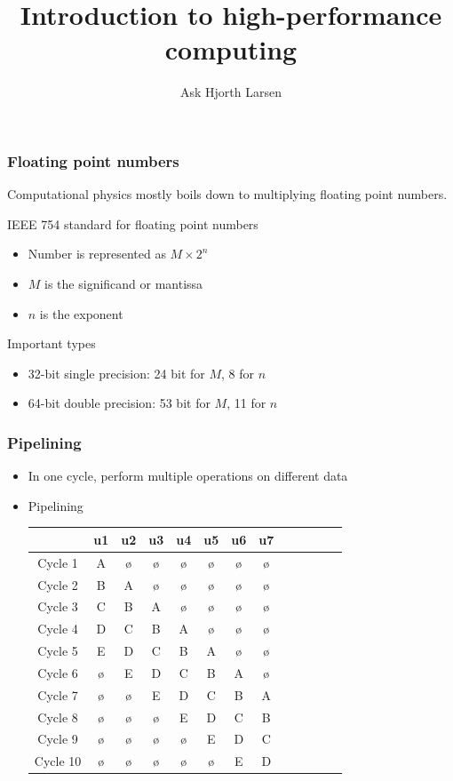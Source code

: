 \documentclass[usenames,dvipsnames,mathserif,compress]{beamer}
\author{Ask Hjorth Larsen}
\begin{document}
\title{Introduction to high-performance computing}

\begin{frame}
  \maketitle
\end{frame}

\begin{frame}
  \frametitle{Floating point numbers}
  Computational physics mostly boils down to multiplying floating point numbers.
  \begin{block}{IEEE 754 standard for floating point numbers}
    \begin{itemize}
    \item Number is represented as $M \times 2^n$
    \item $M$ is the significand or mantissa
    \item $n$ is the exponent
    \end{itemize}
  \end{block}
  \begin{block}{Important types}
    \begin{itemize}
    \item 32-bit single precision: 24 bit for $M$, 8 for $n$
    \item 64-bit double precision: 53 bit for $M$, 11 for $n$
    \end{itemize}
  \end{block}
\end{frame}


\begin{frame}
  \frametitle{Pipelining}
  \begin{itemize}
  \item In one cycle, perform multiple operations on different data
  \item Pipelining
    \begin{tabular}{c|cccccccccccc}
      & u1 &u2&u3&u4&u5&u6&u7&\\\hline
      Cycle 1 & A &ø&ø&ø&ø&ø&ø& \\
      Cycle 2 & B & A &ø&ø&ø&ø&ø& \\
      Cycle 3 & C & B & A &ø&ø&ø&ø& \\
      Cycle 4 & D & C & B & A &ø&ø&ø& \\
      Cycle 5 & E & D & C & B & A &ø&ø& \\
      Cycle 6 & ø & E & D & C & B & A &ø& \\
      Cycle 7 & ø & ø & E & D & C & B & A \\
      Cycle 8 & ø & ø & ø & E & D & C & B \\
      Cycle 9 & ø & ø & ø & ø & E & D & C \\
      Cycle 10 &ø & ø & ø & ø & ø & E & D \\
    \end{tabular}
  \end{itemize}
\end{frame}
\end{document}
